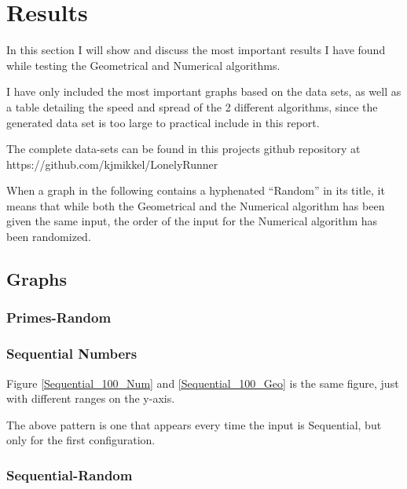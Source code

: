 \section{Results}
\label{results}
In this section I will show and discuss the most important results I have found while testing the Geometrical and Numerical algorithms. 

I have only included the most important graphs based on the data sets, as well as a table detailing the speed and spread of the 2 different algorithms, since the generated data set is too large to practical include in this report.

The complete data-sets can be found in this projects github repository at https://github.com/kjmikkel/LonelyRunner

When a graph in the following contains a hyphenated ``Random'' in its title, it means that while both the Geometrical and the Numerical algorithm has been given the same input, the order of the input for the Numerical algorithm has been randomized. 


\subsection{Graphs}

\subsubsection{Primes-Random}

\subsubsection{Sequential Numbers}
Figure \ref{Sequential_100_Num} and \ref{Sequential_100_Geo} is the same figure, just with different ranges on the y-axis.


The above pattern is one that appears every time the input is Sequential, but only for the first configuration.

\subsubsection{Sequential-Random}


